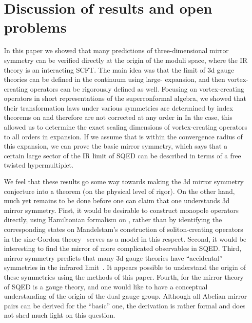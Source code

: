 \documentclass[a4paper,12pt, amsfonts, amssymb]{article}
\providecommand{\RR}{{\mathbb R}}
\renewcommand{\SS}{{\mathbb S}}
\providecommand{\ra}{\rightarrow}
\begin{document}
\section{Discussion of results and open problems}\label{sec:discussion}

In this paper we showed that many predictions of three-dimensional
mirror symmetry can be verified directly at the origin of the moduli
space, where the IR theory is an interacting SCFT. The main idea was that
the \myHighlight{$e\ra\infty$}\coordHE{} limit of 3d gauge theories can be defined in the
continuum using large-\coordHE{} expansion, and then vortex-creating operators
can be rigorously defined as well. Focusing on vortex-creating operators
in short representations of the superconformal algebra, we showed that
their transformation laws under various symmetries are determined by
index theorems on \myHighlight{$\SS^2\times\RR$}\coordHE{} and therefore are not corrected at
any order in \coordHE{} In the \coordHE{} case, this allowed us to determine
the exact scaling dimensions of vortex-creating operators to all orders
in \coordHE{} expansion. If we assume that \coordHE{} is within the convergence
radius of this expansion, we can prove the basic \coordHE{} mirror symmetry,
which says that a certain large sector of the IR limit of \coordHE{}  \coordHE{}
SQED can be described in terms of a free twisted hypermultiplet.

We feel that these results go some way towards making the 3d mirror symmetry
conjecture into a theorem (on the physical level of rigor). 
On the other hand, much yet remains to be
done before one can claim that one understands 3d mirror symmetry.
First, it would be desirable to construct monopole operators
directly, using Hamiltonian formalism on \myHighlight{$\RR^3$}\coordHE{}, rather than by
identifying the corresponding states on \myHighlight{$\SS^2\times\RR.$}\coordHE{} Mandelstam's
construction of soliton-creating operators in the sine-Gordon 
theory~\cite{Mandelstam} serves as a model in this respect. Second,
it would be interesting to find the mirror of more
complicated observables in \coordHE{} SQED. Third, mirror symmetry predicts
that many 3d gauge theories have ``accidental'' symmetries in the infrared
limit~\cite{IS,Kapustin}. It appears possible to understand the origin of 
these symmetries using the methods of this paper.
Fourth, for \coordHE{} the mirror theory of \coordHE{} SQED is a gauge theory,
and one would like to have a conceptual understanding
of the origin of the dual gauge group. Although all Abelian mirror pairs
can be derived for the ``basic'' one, the derivation
is rather formal and does not shed much light on this question. 
\end{document}
